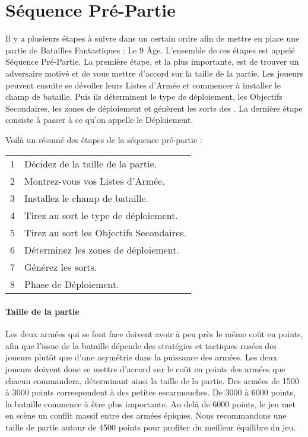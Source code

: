 
\part{Séquence Pré-Partie}

Il y a plusieurs étapes à suivre dans un certain ordre afin de mettre en place une partie de Batailles Fantastiques : Le 9\ieme{} Âge. L'ensemble de ces étapes est appelé Séquence Pré-Partie. La première étape, et la plus importante, est de trouver un adversaire motivé et de vous mettre d'accord sur la taille de la partie. Les joueurs peuvent ensuite se dévoiler leurs Listes d'Armée et commencer à installer le champ de bataille. Puis ils déterminent le type de déploiement, les Objectifs Secondaires, les zones de déploiement et génèrent les sorts des \wizards{}. La dernière étape consiste à passer à ce qu'on appelle le Déploiement.

Voilà un résumé des étapes de la séquence pré-partie :

\hspace*{0.3cm}
\begin{tabular}{c|l}
1 & Décidez de la taille de la partie. \tabularnewline
2 & Montrez-vous vos Listes d'Armée. \tabularnewline
3 & Installez le champ de bataille. \tabularnewline
4 & Tirez au sort le type de déploiement. \tabularnewline
5 & Tirez au sort les Objectifs Secondaires. \tabularnewline
6 & Déterminez les zones de déploiement. \tabularnewline
7 & Générez les sorts. \tabularnewline
8 & Phase de Déploiement. \tabularnewline
\end{tabular}

\hypertarget{gamesize}{\subsection{Taille de la partie}}

Les deux armées qui se font face doivent avoir à peu près le même coût en points, afin que l'issue de la bataille dépende des stratégies et tactiques rusées des joueurs plutôt que d'une asymétrie dans la puissance des armées. Les deux joueurs doivent donc se mettre d'accord sur le coût en points des armées que chacun commandera, déterminant ainsi la taille de la partie. Des armées de 1500 à 3000 points correspondent à des petites escarmouches. De 3000 à 6000 points, la bataille commence à être plus importante. Au delà de 6000 points, le jeu met en scène un conflit massif entre des armées épiques. Nous recommandons une taille de partie autour de 4500 points pour profiter du meilleur équilibre du jeu.

